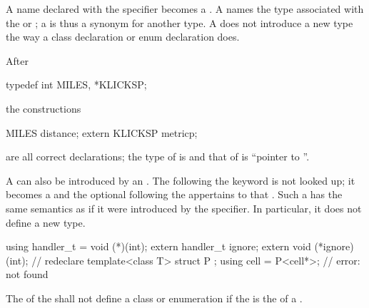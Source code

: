 A name declared with the  specifier becomes a
.
A  names
the type associated with the 
or ;
%
%
%
a  is thus a synonym for another type. A
 does not introduce a new type the way a class
declaration or enum declaration does.
\begin{example}
After
\begin{codeblock}
typedef int MILES, *KLICKSP;
\end{codeblock}
the constructions
\begin{codeblock}
MILES distance;
extern KLICKSP metricp;
\end{codeblock}
are all correct declarations; the type of  is
 and that of  is ``pointer to ''.
\end{example}

\pnum
A  can also be introduced by an
. The  following the
 keyword is not looked up; it becomes a 
and the optional  following the
 appertains to that .
Such a  has the same
semantics as if it were introduced by the  specifier. In
particular, it does not define a new type.
\begin{example}
\begin{codeblock}
using handler_t = void (*)(int);
extern handler_t ignore;
extern void (*ignore)(int);         // redeclare 
template<class T> struct P { };
using cell = P<cell*>;              // error:  not found
\end{codeblock}
\end{example}
The 
of the  shall not define
a class or enumeration if the 
is the  of a .

